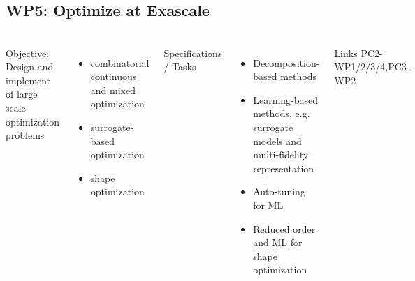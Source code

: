\subsection{WP5: Optimize at Exascale }
\begin{frame}
  \frametitle{\insertsectionhead}
  \framesubtitle{\insertsubsectionhead}
  \begin{columns}
    Objective: Design and implement of large scale optimization problems
    \begin{itemize}
      \item combinatorial continuous and mixed optimization
      \item surrogate-based optimization
      \item shape optimization 
    \end{itemize}
    Specifications / Tasks
    \begin{itemize}
      \item Decomposition-based methods
      \item Learning-based methods, e.g. surrogate models and multi-fidelity representation
      \item Auto-tuning for ML
      \item Reduced order and ML for shape optimization 
    \end{itemize}
    \begin{alertblock}{Links}
      PC2-WP1/2/3/4,PC3-WP2 
    \end{alertblock}
  \end{columns}
\end{frame}

